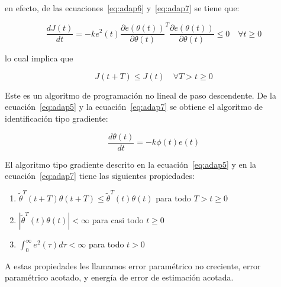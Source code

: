             en efecto, de las ecuaciones~\ref{eq:adap6} y~\ref{eq:adap7} se tiene que:

            \begin{equation*}
                \frac{d J(t)}{dt} = -k e^2(t) \frac{\partial e(\theta(t))}{\partial \theta(t)}^T \frac{\partial e(\theta(t))}{\partial \theta(t)} \le 0 \quad \forall t \ge 0
            \end{equation*}

            lo cual implica que

            \begin{equation}
                J(t + T) \le J(t) \quad \forall T > t \ge 0
            \end{equation}

            Este es un algoritmo de programación no lineal de paso descendente.
            De la ecuación~\ref{eq:adap5} y la ecuación~\ref{eq:adap7} se obtiene el algoritmo de identificación tipo gradiente:

            \begin{equation} \label{eq:adap7}
                \frac{d \theta(t)}{dt} = -k \phi(t)e(t)
            \end{equation}


            \begin{lema}
                El algoritmo tipo gradiente descrito en la ecuación~\ref{eq:adap5} y en la ecuación~\ref{eq:adap7} tiene las siguientes propiedades:

                \begin{enumerate}
                    \item $\tilde{\theta}^T(t + T) \theta(t + T) \le \tilde{\theta}^T(t) \theta(t)$ para todo $T > t \ge 0$
                    \item $\left| \tilde{\theta}^T(t) \theta(t) \right| < \infty$ para casi todo $t \ge 0$
                    \item $\int_0^{\infty} e^2(\tau) d\tau < \infty$ para todo $t > 0$
                \end{enumerate}

                A estas propiedades les llamamos error paramétrico no creciente, error paramétrico acotado, y energía de error de estimación acotada.
            \end{lema}

